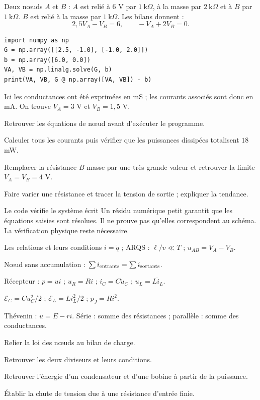 Deux nœuds $A$ et $B$ : $A$ est relié à $6$ V par $1\ \mathrm{k}\Omega$, à la masse par $2\ \mathrm{k}\Omega$ et à $B$ par $1\ \mathrm{k}\Omega$. $B$ est relié à la masse par $1\ \mathrm{k}\Omega$. Les bilans donnent :
\[2{,}5V_A-V_B=6,\qquad -V_A+2V_B=0.\]
\begin{verbatim}
import numpy as np
G = np.array([[2.5, -1.0], [-1.0, 2.0]])
b = np.array([6.0, 0.0])
VA, VB = np.linalg.solve(G, b)
print(VA, VB, G @ np.array([VA, VB]) - b)
\end{verbatim}
Ici les conductances ont été exprimées en mS ; les courants associés sont donc en mA. On trouve $V_A=3$ V et $V_B=1{,}5$ V.
\begin{questions}
\item Retrouver les équations de nœud avant d’exécuter le programme.
\item Calculer tous les courants puis vérifier que les puissances dissipées totalisent $18$ mW.
\item Remplacer la résistance $B$-masse par une très grande valeur et retrouver la limite $V_A=V_B=4$ V.
\item Faire varier une résistance et tracer la tension de sortie ; expliquer la tendance.
\end{questions}
\begin{piege}{Le code vérifie le système écrit}
Un résidu numérique petit garantit que les équations saisies sont résolues. Il ne prouve pas qu’elles correspondent au schéma. La vérification physique reste nécessaire.
\end{piege}


\begin{loi}{Les relations et leurs conditions}
$i=\dot q$ ; ARQS : $\ell/v\ll T$ ; $u_{AB}=V_A-V_B$.\par Nœud sans accumulation : $\sum i_{\rm entrants}=\sum i_{\rm sortants}$.\par Récepteur : $p=ui$ ; $u_R=Ri$ ; $i_C=C\dot u_C$ ; $u_L=L\dot i_L$.\par $\mathcal E_C=Cu_C^2/2$ ; $\mathcal E_L=Li_L^2/2$ ; $p_J=Ri^2$.\par Thévenin : $u=E-ri$. Série : somme des résistances ; parallèle : somme des conductances.
\end{loi}
\begin{questions}
\item Relier la loi des nœuds au bilan de charge.
\item Retrouver les deux diviseurs et leurs conditions.
\item Retrouver l’énergie d’un condensateur et d’une bobine à partir de la puissance.
\item Établir la chute de tension due à une résistance d’entrée finie.
\end{questions}

